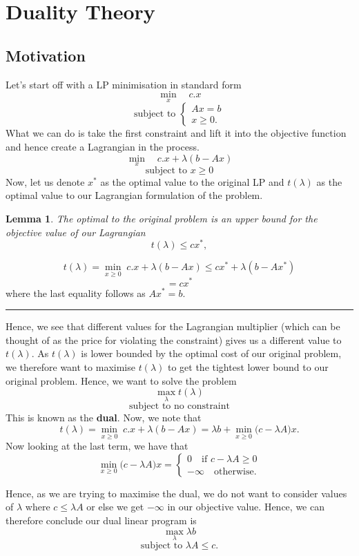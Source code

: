 \documentclass[twoside]{article}
\newtheorem{lemma}[theorem]{Lemma}
\newenvironment{proof}{{\bf Proof:}}{\hfill\rule{2mm}{2mm}}
\begin{document}
\section{Duality Theory}
\subsection{Motivation}

Let's start off with a LP minimisation in standard form 
$$
\min_{x} \quad c.x
$$
$$
\text{subject to }\begin{cases}
Ax = b\\
x \geq 0.
\end{cases}
$$
What we can do is take the first constraint and lift it into the objective function and hence create a Lagrangian in the process.
$$
\min_{x} \quad c.x + \lambda(b - Ax)
$$
$$
\text{subject to }
x \geq 0
$$
Now, let us denote $x^*$ as the optimal value to the original LP and $t(\lambda)$ as the optimal value to our Lagrangian formulation of the problem.

\begin{lemma}The optimal to the original problem is an upper bound for the objective value of our Lagrangian 
$$
t(\lambda) \leq cx^*,
$$
\end{lemma}
\begin{proof}
$$
t(\lambda) = \min_{x \geq 0} \; c.x + \lambda(b - Ax) \leq cx^* + \lambda(b - Ax^*)
$$
$$
= cx^*
$$
where the last equality follows as $Ax^* = b.$
\end{proof}

Hence, we see that different values for the Lagrangian multiplier (which can be thought of as the price for violating the constraint) gives us a different value to $t(\lambda).$ As $t(\lambda)$ is lower bounded by the optimal cost of our original problem, we therefore want to maximise $t(\lambda)$ to get the tightest lower bound to our original problem. Hence, we want to solve the problem
$$
\max_{\lambda}t(\lambda)
$$
$$
\text{subject to no constraint}
$$
This is known as the \textbf{dual}. Now, we note that 
$$
t(\lambda) = \min_{x \geq 0} \; c.x + \lambda(b - Ax) = \lambda b + \min_{x \geq 0}\bigg(c - \lambda A \bigg)x.
$$
Now looking at the last term, we have that 
$$
\min_{x \geq 0}\bigg(c - \lambda A \bigg)x = 
\begin{cases}
0 \quad \text{if } c - \lambda A \geq 0\\
-\infty \quad \text{otherwise.}
\end{cases}
$$

Hence, as we are trying to maximise the dual, we do not want to consider values of $\lambda$ where $c \leq \lambda A$ or else we get $-\infty$ in our objective value. Hence, we can therefore conclude our dual linear program is 
$$
\max_{\lambda} \lambda b
$$
$$
\text{subject to } \lambda A \leq c.
$$
\end{document}
